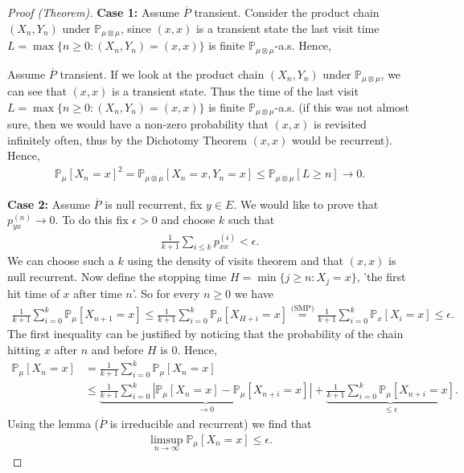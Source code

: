 \begin{proof}[Proof (Theorem)]
	\textbf{Case 1:} 
	Assume $\overline{P}$ transient. Consider the product chain $(X_n, Y_n)$ under $\mathbb{P}_{\mu \otimes \mu }$, since $(x,x)$ is a transient state the last visit time $L=\max\{n\geq 0: (X_n, Y_n)=(x,x)\}$ is finite $\mathbb{P}_{\mu \otimes \mu}$-a.s. Hence,

	{\color{blue}
	Assume $\overline{P}$ transient. If we look at the product chain $(X_n, Y_n)$ under $\mathbb{P}_{\mu \otimes \mu}$, we can see that $(x,x)$ is a transient state. Thus the time of the last visit  $L = \max\{n\geq 0: (X_n, Y_n) = (x,x) \}$ is finite $\mathbb{P}_{\mu \otimes \mu}$-a.s. (if this was not almost sure, then we would have a non-zero probability that $(x,x)$ is revisited infinitely often, thus by the Dichotomy Theorem $(x,x)$ would be recurrent). Hence, 
}
\begin{align}
	\mathbb{P}_{\mu } \left[ X_n = x \right]^2 = \mathbb{P}_{\mu \otimes \mu} \left[ X_n =x, Y_n=x \right] \leq \mathbb{P}_{\mu \otimes \mu } \left[ L \geq n \right] \to 0.
\end{align}

\textbf{Case 2:} Assume $\overline{P}$ is null recurrent, fix  $y \in E$. We would like to prove that $p_{yx}^{(n)} \to 0$. To do this fix $\epsilon > 0$ and choose $k$ such that
\begin{align}
	\frac{1}{k+1} \sum_{i\leq k}^{} p_{xx}^{(i)} < \epsilon.
\end{align}
{\color{blue}We can choose such a $k$ using the density of visits theorem and that $(x,x)$ is null recurrent.} Now define the stopping time $H = \min\{j \geq n: X_j = x\}${\color{blue}, 'the first hit time of $x$ after time $n$'}. So for every $n\geq 0$ we have
\begin{align}
	\frac{1}{k+1} \sum_{i=0}^{k} \mathbb{P}_{\mu } \left[ X_{n+1}=x \right]  \leq \frac{1}{k+1} \sum_{i=0}^{k} \mathbb{P}_{\mu } \left[ X_{H+i}=x \right]  
	\stackrel{\textrm{(SMP)}}{=} \frac{1}{k+1} \sum_{i=0}^{k} \mathbb{P}_{x} \left[ X_i =x \right]  \leq \epsilon.
\end{align}
{\color{blue}The first inequality can be justified by noticing that the probability of the chain hitting $x$ after $n$ and before $ H$ is 0.} Hence,
\begin{align}
	\mathbb{P}_{\mu } \left[ X_n = x \right] &= \frac{1}{k+1} \sum_{i=0}^{k} \mathbb{P}_{\mu } \left[ X_n = x \right] \\
						 &\leq \underbrace{\frac{1}{k+1}\sum_{i=0}^{k} \left| \mathbb{P}_{\mu } \left[ X_n = x \right] - \mathbb{P}_{\mu } \left[ X_{n+i} = x \right] \right|}_{\to 0} + \underbrace{\frac{1}{k+1} \sum_{i=0}^{k} \mathbb{P}_{\mu } \left[ X_{n+i}=x \right]}_{\leq \epsilon} 
.\end{align}
Using the lemma ($\overline{P}$ is irreducible and recurrent) we find that
\begin{align}
	\limsup_{n\to\infty} \mathbb{P}_{\mu } \left[ X_n = x \right] \leq \epsilon.
\end{align}
\end{proof}


